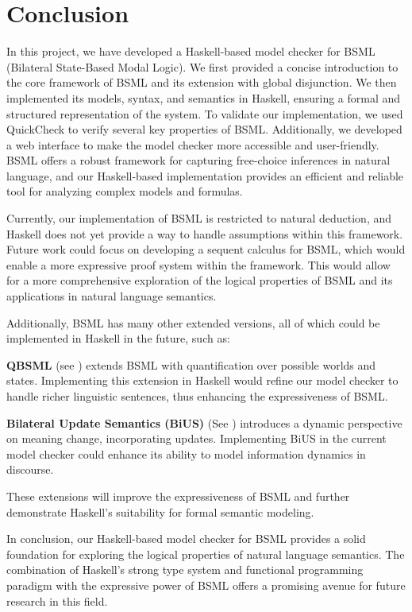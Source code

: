\section{Conclusion}\label{sec:Conclusion}

In this project, we have developed a Haskell-based model checker for BSML (Bilateral State-Based Modal Logic). 
We first provided a concise introduction to the core framework of BSML and its extension with global disjunction.
We then implemented its models, syntax, and semantics in Haskell, ensuring a formal and structured representation of the system.\@ 
To validate our implementation, we used QuickCheck to verify several key properties of BSML.\@
Additionally, we developed a web interface to make the model checker more accessible and user-friendly.
BSML offers a robust framework for capturing free-choice inferences in natural language,
and our Haskell-based implementation provides an efficient and reliable tool for analyzing complex models and formulas.


Currently, our implementation of BSML is restricted to natural deduction, and Haskell does not yet provide a way to handle assumptions within this framework.
Future work could focus on developing a sequent calculus for BSML, which would enable a more expressive proof system within the framework.
This would allow for a more comprehensive exploration of the logical properties of BSML and its applications in natural language semantics.

Additionally, BSML has many other extended versions, all of which could be implemented in Haskell in the future, such as:

\textbf{QBSML} (see \citet{Aloni2023}) extends BSML with quantification over possible worlds and states. Implementing this extension in Haskell would refine our model checker to handle richer linguistic sentences, thus enhancing the expressiveness of BSML.\@

\textbf{Bilateral Update Semantics (BiUS)} (See \citet{BiUS2023}) introduces a dynamic perspective on meaning change, incorporating updates. Implementing BiUS in the current model checker could enhance its ability to model information dynamics in discourse.

These extensions will improve the expressiveness of BSML and further demonstrate Haskell's suitability for formal semantic modeling.

In conclusion, our Haskell-based model checker for BSML provides a solid foundation for exploring the logical properties of natural language semantics.
The combination of Haskell's strong type system and functional programming paradigm with the expressive power of BSML offers a promising avenue for future research in this field.
